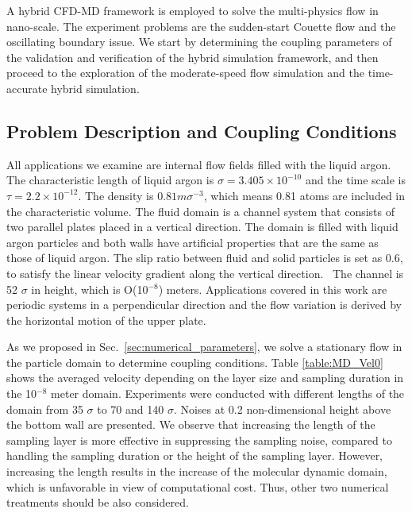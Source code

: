 \documentclass[preprint,12pt]{elsarticle}
\begin{document}
A hybrid CFD-MD framework is employed to solve the multi-physics flow in nano-scale. The experiment problems are the sudden-start Couette flow and the oscillating boundary issue. We start by determining the coupling parameters of the validation and verification of the hybrid simulation framework, and then proceed to the exploration of the moderate-speed flow simulation and the time-accurate hybrid simulation.

\subsection{Problem Description and Coupling Conditions}
\label{sec:accuracy_conditions}

All applications we examine are internal flow fields filled with the liquid argon. The characteristic length of liquid argon is ${\sigma}=3.405{\times}10^{-10}$ and the time scale is $\tau=2.2{\times}10^{-12}$. The density is $0.81m{\sigma}^{-3}$, which means 0.81 atoms are included in the characteristic volume. The fluid domain is a channel system that consists of two parallel plates placed in a vertical direction. The domain is filled with liquid argon particles and both walls have artificial properties that are the same as those of liquid argon. The slip ratio between fluid and solid particles is set as 0.6, to satisfy the linear velocity gradient along the vertical direction.~\cite{Nie}
The channel is 52 $\sigma$ in height, which is O(10$^{-8}$) meters. Applications covered in this work are periodic systems in a perpendicular direction and the flow variation is derived by the horizontal motion of the upper plate.


As we proposed in Sec.~\ref{sec:numerical_parameters}, we solve a stationary flow in the particle domain to determine coupling conditions. Table \ref{table:MD_Vel0} shows the averaged velocity depending on the layer size and sampling duration in the 10$^{-8}$ meter domain. Experiments were conducted with different lengths of the domain from 35 $\sigma$ to 70 and 140 $\sigma$. Noises at 0.2 non-dimensional height above the bottom wall are presented.
We observe that increasing the length of the sampling layer is more effective in suppressing the sampling noise, compared to handling the sampling duration or the height of the sampling layer. However, increasing the length results in the increase of the molecular dynamic domain, which is unfavorable in view of computational cost. Thus, other two numerical treatments should be also considered.
\end{document}
